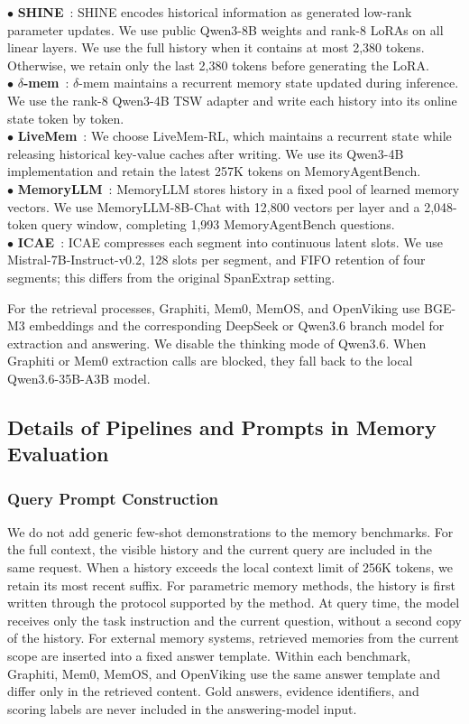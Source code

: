 $\bullet$ \textbf{SHINE}~\cite{liu2026shine}: SHINE encodes historical information as generated low-rank parameter updates.
We use public Qwen3-8B weights and rank-8 LoRAs on all linear layers.
We use the full history when it contains at most 2,380 tokens.
Otherwise, we retain only the last 2,380 tokens before generating the LoRA. \\
$\bullet$ \textbf{$\delta$-mem}~\cite{lei2026delta}: $\delta$-mem maintains a recurrent memory state updated during inference. We use the rank-8 Qwen3-4B TSW adapter and write each history into its online state token by token. \\
$\bullet$ \textbf{LiveMem}~\cite{liu2026livemem}: We choose LiveMem-RL, which maintains a recurrent state while releasing historical key-value caches after writing.
We use its Qwen3-4B implementation and retain the latest 257K tokens on MemoryAgentBench.\\
$\bullet$ \textbf{MemoryLLM}~\cite{wang2024memoryllm}: MemoryLLM stores history in a fixed pool of learned memory vectors.
We use MemoryLLM-8B-Chat with 12,800 vectors per layer and a 2,048-token query window, completing 1,993 MemoryAgentBench questions.\\
$\bullet$ \textbf{ICAE}~\cite{ge2023context}: ICAE compresses each segment into continuous latent slots. We use Mistral-7B-Instruct-v0.2, 128 slots per segment, and FIFO retention of four segments; this differs from the original SpanExtrap setting.

For the retrieval processes, Graphiti, Mem0, MemOS, and OpenViking use BGE-M3 embeddings and the corresponding DeepSeek or Qwen3.6 branch model for extraction and answering.
We disable the thinking mode of Qwen3.6.
When Graphiti or Mem0 extraction calls are blocked, they fall back to the local Qwen3.6-35B-A3B model.

\subsection{Details of Pipelines and Prompts in Memory Evaluation}
\label{appendix:eval_memory_pipeline_details}

\subsubsection{Query Prompt Construction}
\label{appendix:memory_query_prompt_construction}

We do not add generic few-shot demonstrations to the memory benchmarks.
For the full context, the visible history and the current query are included in the same request. When a history exceeds the local context limit of 256K tokens, we retain its most recent suffix. For parametric memory methods, the history is first written through the protocol supported by the method.
At query time, the model receives only the task instruction and the current question, without a second copy of the history.
For external memory systems, retrieved memories from the current scope are inserted into a fixed answer template.
Within each benchmark, Graphiti, Mem0, MemOS, and OpenViking use the same answer template and differ only in the retrieved content.
Gold answers, evidence identifiers, and scoring labels are never included in the answering-model input.

